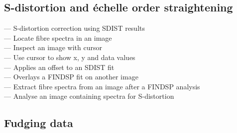 
\subsection{\label{classifdistort}S-distortion and \'echelle order straightening}

 --- S-distortion correction using SDIST results\\
 --- Locate fibre spectra in an image\\
 --- Inspect an image with cursor\\
 --- Use cursor to show x, y and data values\\
 --- Applies an offset to an SDIST fit\\
 --- Overlays a FINDSP fit on another image\\
 --- Extract fibre spectra from an image after a FINDSP analysis\\
 --- Analyse an image containing spectra for S-distortion


\subsection{\label{classiffudge}Fudging data}

